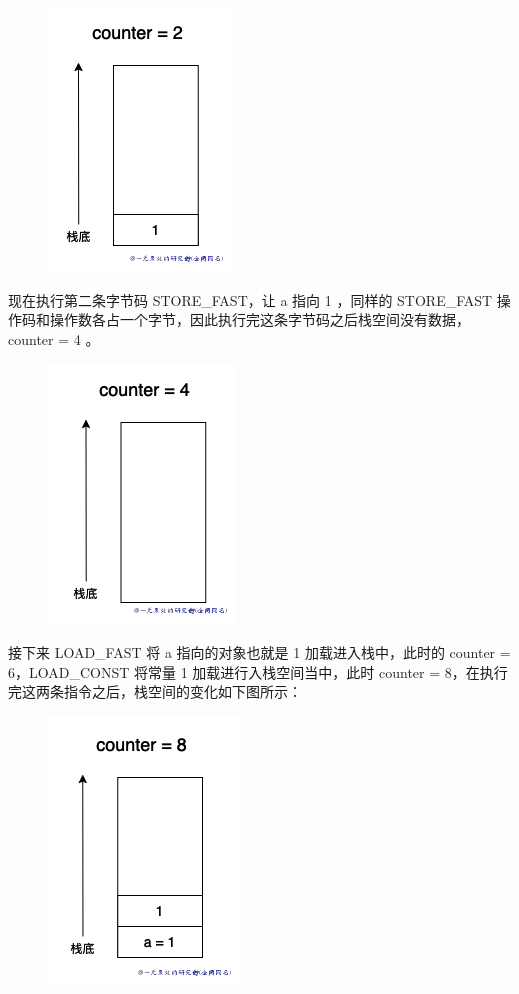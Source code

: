     \begin{figure}[H]
        \centering
            \includegraphics[scale=.25]{images/57-bytecode.png}
						\caption{ }
        \label{fig:my_label}
    \end{figure}
    
现在执行第二条字节码 STORE\_FAST，让 a 指向 1 ，同样的 STORE\_FAST 操作码和操作数各占一个字节，因此执行完这条字节码之后栈空间没有数据，counter = 4 。

    \begin{figure}[H]
        \centering
            \includegraphics[scale=.25]{images/58-bytecode.png}
						\caption{ }
        \label{fig:my_label}
    \end{figure}
    
接下来 LOAD\_FAST 将 a 指向的对象也就是 1 加载进入栈中，此时的 counter = 6，LOAD\_CONST 将常量 1 加载进行入栈空间当中，此时 counter = 8，在执行完这两条指令之后，栈空间的变化如下图所示：

    \begin{figure}[H]
        \centering
            \includegraphics[scale=.25]{images/59-bytecode.png}
						\caption{ }
        \label{fig:my_label}
    \end{figure}
    
